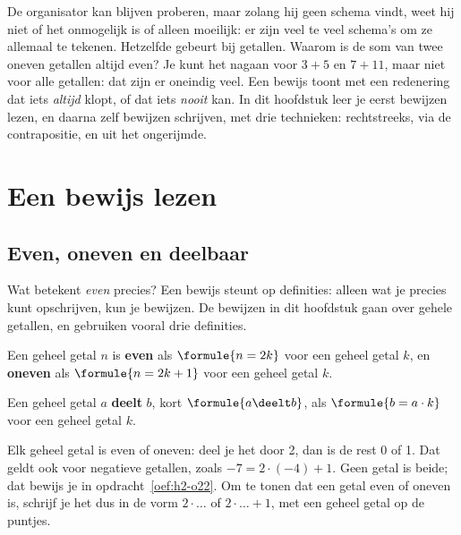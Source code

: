 De organisator kan blijven proberen, maar zolang hij geen schema vindt, weet hij niet of het onmogelijk is of alleen moeilijk: er zijn veel te veel schema's om ze allemaal te tekenen. Hetzelfde gebeurt bij getallen. Waarom is de som van twee oneven getallen altijd even? Je kunt het nagaan voor $3 + 5$ en $7 + 11$, maar niet voor alle getallen: dat zijn er oneindig veel. Een bewijs toont met een redenering dat iets \textit{altijd} klopt, of dat iets \textit{nooit} kan. In dit hoofdstuk leer je eerst bewijzen lezen, en daarna zelf bewijzen schrijven, met drie technieken: rechtstreeks, via de contrapositie, en uit het ongerijmde.

\begin{oefeningen}[Start]

\end{oefeningen}

\section{Een bewijs lezen}\label{sec:h2-lezen}

\subsection{Even, oneven en deelbaar}

Wat betekent \textit{even} precies? Een bewijs steunt op definities: alleen wat je precies kunt opschrijven, kun je bewijzen. De bewijzen in dit hoofdstuk gaan over gehele getallen, en gebruiken vooral drie definities.

\begin{theorie}
Een geheel getal $n$ is \textbf{\textcolor{accent}{even}} als $\formule{n = 2k}$ voor een geheel getal $k$, en \textbf{\textcolor{accent}{oneven}} als $\formule{n = 2k + 1}$ voor een geheel getal $k$.

\vspace{1mm}
Een geheel getal $a$ \textbf{\textcolor{accent}{deelt}} $b$, kort $\formule{a \deelt b}$, als $\formule{b = a \cdot k}$ voor een geheel getal $k$.
\end{theorie}

Elk geheel getal is even of oneven: deel je het door 2, dan is de rest 0 of 1. Dat geldt ook voor negatieve getallen, zoals $-7 = 2 \cdot (-4) + 1$. Geen getal is beide; dat bewijs je in opdracht~\ref{oef:h2-o22}. Om te tonen dat een getal even of oneven is, schrijf je het dus in de vorm $2 \cdot \ldots$ of $2 \cdot \ldots + 1$, met een geheel getal op de puntjes.

